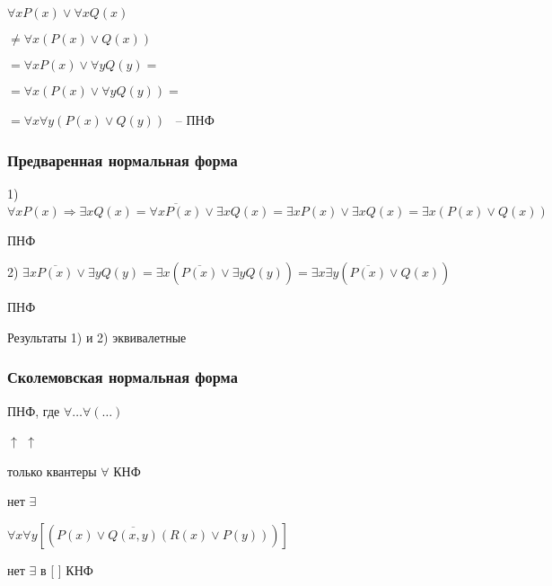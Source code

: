 \documentclass[russian]{lecture-notes}
\begin{document}
    \begin{example}
        $\forall x P(x) \lor \forall x Q(x)$

        $\neq \forall x (P(x) \lor Q(x))$

        $ = \forall x P(x) \lor \forall y Q(y) = $

        $= \forall x (P(x) \lor \forall y Q(y)) = $

        $= \forall x \forall y (P(x) \lor Q(y))$ ~-- ПНФ
    \end{example}


    \subsubsection{Предваренная нормальная форма}

    \begin{example}

        1) $\forall x P(x) \Rightarrow \exists x Q(x) = \overline{\forall x P(x)} \lor \exists x Q(x)
        = \exists x P(x) \lor \exists x Q(x) = \exists x
        ( P(x) \lor Q(x))$

    \quad ПНФ

        2) $\exists x \overline{P(x)} \lor \exists y Q(y) = \exists x (\overline{P(x)} \lor \exists y Q(y)) =
        \exists x \exists y (\overline{P(x)} \lor Q(x))$

    \qquad \qquad \qquad \qquad \qquad \qquad \qquad \qquad \qquad \qquad \qquad ПНФ

        Результаты 1) и 2) эквивалетные

    \end{example}

    \subsubsection{Сколемовская нормальная форма}

    \begin{definition}
        ПНФ, где $\forall \dots \forall (\dots)$

        \qquad \qquad \qquad \qquad \qquad \quad $\uparrow$ \qquad \quad $\uparrow$

        \qquad \quad  только квантеры $\forall$ \qquad КНФ

        \qquad \qquad \qquad нет $\exists$


        \end{definition}

    \begin{example}

        $\forall x \forall y [ (P(x) \lor \overline{Q(x,y)}(R(x) \lor P(y)))]$

        нет $\exists$ в [ ] КНФ

        \end{example}
\end{document}
